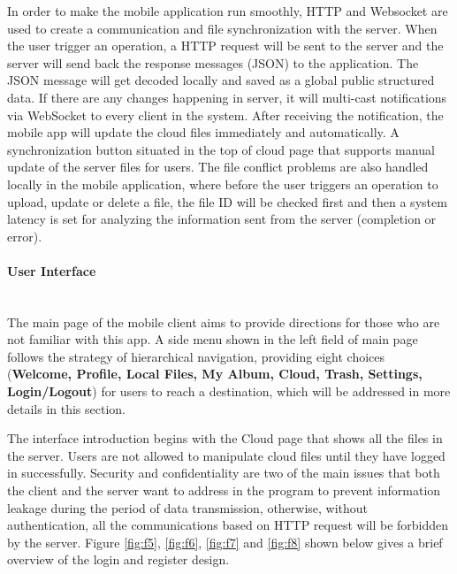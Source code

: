 \documentclass{article}
\begin{document}
In order to make the mobile application run smoothly, HTTP and Websocket are used to create a communication and file synchronization with the server. When the user trigger an operation, a HTTP request will be sent to the server and the server will send back the response messages (JSON) to the application. The JSON message will get decoded locally and saved as  a global public structured data. If there are any changes happening in server, it will multi-cast notifications via WebSocket to every client in the system. After receiving the notification, the mobile app will update the cloud files immediately and automatically. A synchronization button situated in the top of cloud page that supports manual update of the server files for users. The file conflict problems are also handled locally in the mobile application, where before the user triggers an operation to upload, update or delete a file, the file ID will be checked first and then a system latency is set for analyzing the information sent from the server (completion or error). 

\paragraph{User Interface}\mbox{} \\

The main page of the mobile client aims to provide directions for those who are not familiar with this app. A side menu shown in the left field of main page follows the strategy of hierarchical navigation, providing eight choices (\textbf{Welcome, Profile, Local Files, My Album, Cloud, Trash, Settings, Login/Logout}) for users to reach a destination, which will be addressed in more details in this section. 

The interface introduction begins with the Cloud page that shows all the files in the server. Users are not allowed to manipulate cloud files until they have logged in successfully. Security and confidentiality are two of the main issues that both the client and the server want to address in the program to prevent information leakage during the period of data transmission, otherwise, without authentication, all the communications based on HTTP request will be forbidden by the server. Figure \ref{fig:f5}, \ref{fig:f6}, \ref{fig:f7} and \ref{fig:f8} shown below gives a brief overview of the login and register design.
\end{document}
